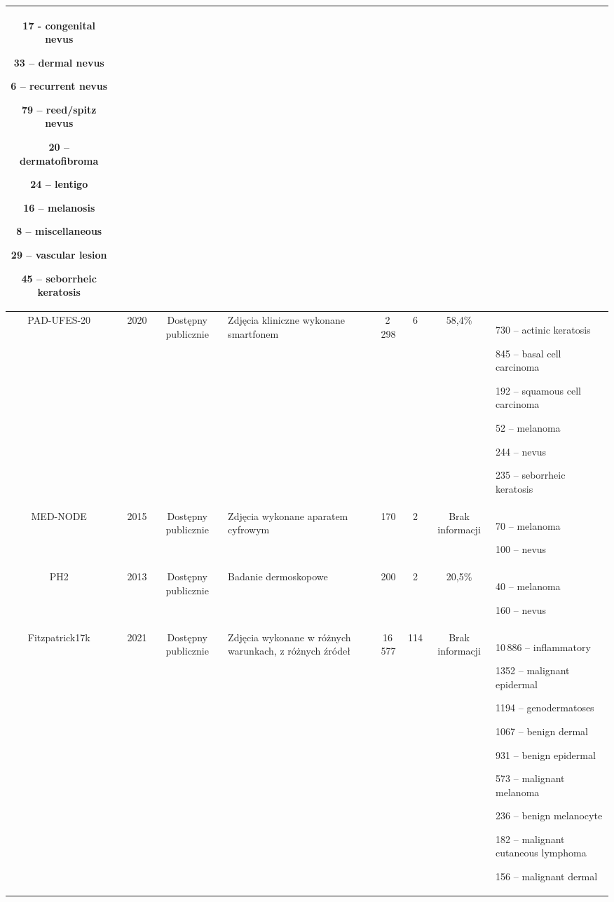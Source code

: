 \begin{table}
\begin{tabular}{|c|c|c|c|p{2cm}|c|c|c|p{3cm}|}
		17 - congenital nevus
		
		33 – dermal nevus
		
		6 – recurrent nevus
		
		79 – reed/spitz nevus
		
		
		20 – dermatofibroma
		
		24 – lentigo
		
		16 – melanosis
		
		8 – miscellaneous
		
		29 – vascular lesion
		
		
		45 – seborrheic keratosis \\ \hline
		
		PAD-UFES-20 & \cite{Castro_2020} & 2020 & Dostępny publicznie & Zdjęcia kliniczne wykonane smartfonem & 2\,298 & 6 & 58,4\% &
		730 – actinic keratosis
		
		845 – basal cell carcinoma
		
		192 – squamous cell carcinoma
		
		52 – melanoma
		
		244 – nevus
		
		235 – seborrheic keratosis \\ \hline
		
		MED-NODE & \cite{giotis2015med} & 2015 & Dostępny publicznie & Zdjęcia wykonane aparatem cyfrowym & 170 & 2 & Brak informacji &
		70 – melanoma
		
		100 – nevus \\ \hline
		
		PH2 & \cite{Rozeira_2013} & 2013 & Dostępny publicznie & Badanie dermoskopowe & 200 & 2 & 20,5\% &
		40 – melanoma
		
		160 – nevus \\ \hline
		
		Fitzpatrick17k & \cite{groh2021evaluating} & 2021 & Dostępny publicznie & Zdjęcia wykonane w różnych warunkach, z różnych źródeł & 16\,577 & 114 & Brak informacji &
		10\,886 – inflammatory
		
		1352 – malignant epidermal
		
		1194 – genodermatoses
		
		1067 – benign dermal
		
		931 – benign epidermal
		
		573 – malignant melanoma
		
		236 – benign melanocyte
		
		182 – malignant cutaneous lymphoma
		
		156 – malignant dermal \\ \hline
		

\end{tabular}
\end{table}
